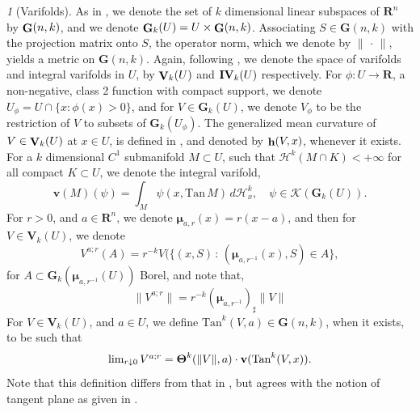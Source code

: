 \documentclass{article}
\theoremstyle{plain}
\theoremstyle{definition}
\theoremstyle{plain}
\theoremstyle{remark}
\newtheorem{propparagraph}[theorem]{}
\theoremstyle{remark}
\theoremstyle{plain}
\DeclareMathOperator{\G}{{\bf G}}
\DeclareMathOperator{\Var}{{\bf V}}
\DeclareMathOperator{\IVar}{{\bf IV}}
\DeclareMathOperator*{\Density}{\boldsymbol{\rm \Theta}}
\DeclareMathOperator{\bfh}{{\bf h}}
\begin{document}
\begin{propparagraph}[Varifolds]\label{proppara: varifold notation}
As in \cite[2.3]{Allard1972OnTF}, we denote the set of $k$ dimensional linear subspaces of $\mathbf R^n$ by $\G(n,k)$, and we denote $\G_k(U) = U\times \G(n,k)$.
Associating $S \in \mathbf{G} (n, k)$ with the projection matrix onto $S$, the operator norm, which we denote by $\| \, \cdot \, \|$, yields a metric on $\mathbf{G} (n, k)$.
Again, following \cite[3.1, 3.5]{Allard1972OnTF}, we denote the space of varifolds and integral varifolds in $U$, by $\Var_k(U)$ and $\IVar_k(U)$ respectively.
For $\phi \colon U \rightarrow \mathbf{R}$, a non-negative, class 2 function with compact support, we denote $U_{\phi} = U \cap \{x  \colon \phi (x) > 0\}$, and for $V \in \mathbf{G}_{k} (U)$, we denote $V_{\phi}$ to be the restriction of $V$ to subsets of $\mathbf{G}_{k} (U_{\phi})$.
The generalized mean curvature of $V\in \Var_k(U)$ at $x\in U$, is defined in \cite[4.3]{Allard1972OnTF}, and denoted by $\bfh(V,x)$, whenever it exists. 
For a $k$ dimensional $C^{1}$ submanifold $M \subset U$, such that $\mathscr{H}^{k} (M \cap K) < + \infty$ for all compact $K \subset U$, we denote the integral varifold, 
\begin{equation*}
    \mathbf{v} (M) (\psi) = \int_{M} \psi (x, \mathrm{Tan} \, M) \, d \mathscr{H}^{k}_{x}, \quad \psi \in \mathscr{K} (\mathbf{G}_{k} (U)).
\end{equation*}
For $r > 0$, and $a \in \mathbf{R}^{n}$, we denote $\boldsymbol{\mu}_{a, r} (x) = r (x - a)$, and then for $V \in \mathbf{V}_{k} (U)$, we denote 
\begin{equation*}
    V^{a; r} (A) = r^{-k} V (\{ (x, S) \, \colon \, (\boldsymbol{\mu}_{a, r^{-1}} (x), S) \in A\},
\end{equation*}
for $A \subset \mathbf{G}_{k} (\boldsymbol{\mu}_{a, r^{-1}} (U))$ Borel, and note that, 
\begin{equation*}
    \textstyle \| V^{a; r} \| = r^{-k} (\boldsymbol{\mu}_{a, r^{-1}})_{\sharp} \| V \|
\end{equation*}
For $V \in \mathbf{V}_{k} (U)$, and $a \in U$, we define $\mathrm{Tan}^{k} (V, a) \in \mathbf{G} (n, k)$, when it exists, to be such that
    \begin{equation*}
        \textstyle \lim_{r \downarrow 0} V^{a; r} = \Density^{k} (\| V \|, a) \cdot \mathbf{v} (\mathrm{Tan}^{k} (V, x)).
    \end{equation*}
Note that this definition differs from that in \cite[2.8(3)]{Allard1972OnTF}, but agrees with the notion of tangent plane as given in \cite[38.1]{Simon-GMT}.
\end{propparagraph}
\end{document}

